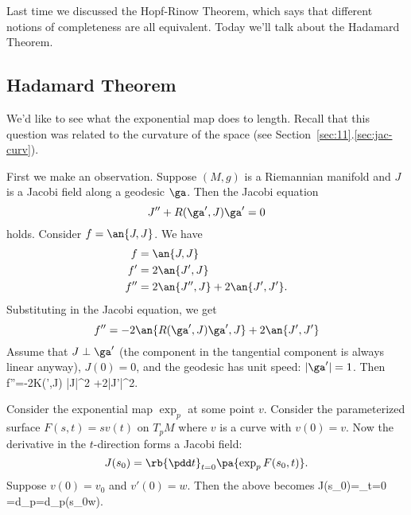 
Last time we discussed the Hopf-Rinow Theorem, which says that different notions of completeness are all equivalent. Today we'll talk about the Hadamard Theorem.

\subsection{Hadamard Theorem}
We'd like to see what the exponential map does to length. Recall that this question was related to the curvature of the space (see Section~\ref{sec:11}.\ref{sec:jac-curv}).

First we make an observation. Suppose $(M,g)$ is a Riemannian manifold and $J$ is a Jacobi field along a geodesic $\ga$. Then the Jacobi equation
\[
J''+R(\ga',J)\ga'=0
\]
holds.
Consider $f=\an{J,J}$. We have
\begin{align*}
f&=\an{J,J}\\
f'&=2\an{J',J}\\
f''&=2\an{J'',J}+2\an{J',J'}.
\end{align*}
Substituting in the Jacobi equation, we get
\[
f''=-2\an{R(\ga',J)\ga',J}+2\an{J',J'}
\]
Assume that $J\perp \ga'$ (the component in the tangential component is always linear anyway), $J(0)=0$, and the geodesic has unit speed: $|\ga'|=1$. Then 
f''=-2K(\ga',J) |J|^2 +2|J'|^2.
\eeq

Consider the exponential map $\exp_p$ at some point $v$. %
Consider the parameterized surface $F(s,t)=sv(t)$ on $T_pM$ where $v$ is a curve with $v(0)=v$. Now the derivative in the $t$-direction forms a Jacobi field:
\[
J(s_0)=\rb{\pdd t}_{t=0} \pa{\exp_p F(s_0,t)}.
\] 
Suppose $v(0)=v_0$ and $v'(0)=w$. Then the above becomes
J(s_0)=_{t=0}  =d\exp_p=d\exp_p(s_0w).
\eeq

